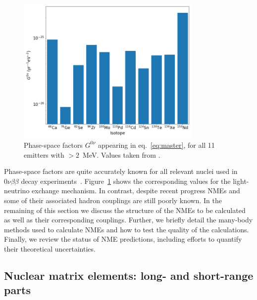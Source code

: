 \begin{figure}[t]
	\begin{center}
	\includegraphics[width=0.8\textwidth]{img/g0nu.png} 	\caption{Phase-space factors $G^{0\nu}$ appearing in eq.~\ref{eq:master}, for all 11 \bb emitters with \Qbb$>2$~MeV. Values taken from \cite{Kotila:2012zza}.
 \label{fig:phase_space}}
	\end{center}
\end{figure}

Phase-space factors are quite accurately known for all relevant nuclei used in $0\nu\beta\beta$ decay experiments~\cite{Kotila:2012zza,Stoica:2013lka}. Figure~\ref{fig:phase_space} shows the corresponding values for the light-neutrino exchange mechanism.
In contrast, despite recent progress NMEs and some of their associated hadron couplings are still poorly known. In the remaining of this section we discuss the structure of the NMEs to be calculated as well as their corresponding couplings. Further, we briefly detail the many-body methods used to calculate NMEs and how to test the quality of the calculations. Finally, we review the status of NME predictions, including efforts to quantify their theoretical uncertainties.

\subsection{Nuclear matrix elements: long- and short-range parts}
\label{subsec:nme_parts}

